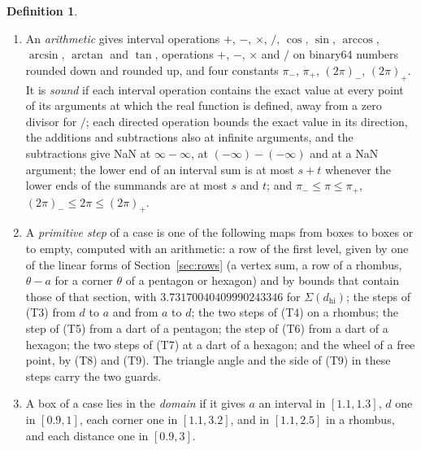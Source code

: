 \documentclass[12pt]{amsart}
\theoremstyle{definition}
\newtheorem{definition}[theorem]{Definition}
\theoremstyle{plain}
\theoremstyle{definition}
\newcommand{\dhi}{d_{\mathrm{hi}}}
\newcommand{\leanmap}[1]{\ignorespaces}
\newcommand{\mapnote}[1]{\ignorespaces}
\begin{document}
\begin{definition}\label{def:impl}\leanmap{Tammes15.Contractors.Fl, Tammes15.Contractors.Iv, Tammes15.Contractors.Rnd, Tammes15.Contractors.Rnd.Sound, Tammes15.Contractors.Prim, Tammes15.Contractors.Prim.Allowed, Tammes15.Contractors.primStep, Tammes15.Contractors.RowKind, Tammes15.Contractors.SysRow, Tammes15.Contractors.InOpen, Tammes15.Contractors.triAngleSt, Tammes15.Contractors.triAngle, Tammes15.Contractors.side, Tammes15.Contractors.DomOK, Tammes15.Contractors.Run, Tammes15.Contractors.WheelOut, Tammes15.Contractors.Impl, Tammes15.Contractors.onDom}\mapnote{the primitive steps are definitions of the formalization, with the two guards, over an arbitrary arithmetic; item (6) is about the program and is not formalized; it is the assumption of Section \ref{sec:notlean}}
\begin{enumerate}
\item An \emph{arithmetic} gives interval operations $+$, $-$, $\times$, $/$, $\cos$, $\sin$, $\arccos$, $\arcsin$, $\arctan$ and $\tan$, operations $+$, $-$, $\times$ and $/$ on binary64 numbers rounded down and rounded up, and four constants $\pi_-$, $\pi_+$, $(2\pi)_-$, $(2\pi)_+$. It is \emph{sound} if each interval operation contains the exact value at every point of its arguments at which the real function is defined, away from a zero divisor for $/$; each directed operation bounds the exact value in its direction, the additions and subtractions also at infinite arguments, and the subtractions give NaN at $\infty-\infty$, at $(-\infty)-(-\infty)$ and at a NaN argument; the lower end of an interval sum is at most $s+t$ whenever the lower ends of the summands are at most $s$ and $t$; and $\pi_-\le\pi\le\pi_+$, $(2\pi)_-\le2\pi\le(2\pi)_+$.
\item A \emph{primitive step} of a case is one of the following maps from boxes to boxes or to empty, computed with an arithmetic: a row of the first level, given by one of the linear forms of Section~\ref{sec:rows} (a vertex sum, a row of a rhombus, $\theta-a$ for a corner $\theta$ of a pentagon or hexagon) and by bounds that contain those of that section, with $3.73170040409990243346$ for $\Sigma(\dhi)$; the steps of (T3) from $d$ to $a$ and from $a$ to $d$; the two steps of (T4) on a rhombus; the step of (T5) from a dart of a pentagon; the step of (T6) from a dart of a hexagon; the two steps of (T7) at a dart of a hexagon; and the wheel of a free point, by (T8) and (T9). The triangle angle and the side of (T9) in these steps carry the two guards.
\item A box of a case lies in the \emph{domain} if it gives $a$ an interval in $[1.1,1.3]$, $d$ one in $[0.9,1]$, each corner one in $[1.1,3.2]$, and in $[1.1,2.5]$ in a rhombus, and each distance one in $[0.9,3]$.

\end{enumerate}
\end{definition}
\end{document}

